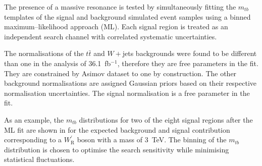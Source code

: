 The presence of a massive resonance is tested by simultaneously fitting the $m_{tb}$
templates of the signal and background simulated event samples using a binned 
maximum--likelihood approach (ML).
Each signal region is 
treated as an independent search channel with correlated systematic uncertainties.

The normalisations of the $t\bar{t}$ and $W+$jets backgrounds were found to be different than one 
in the analysis of 36.1~fb$^{-1}$, therefore they are free parameters in the fit. They are 
constrained by Asimov dataset to one by construction. 
The other background normalisations are assigned Gaussian priors based on their 
respective normalisation uncertainties. 
The signal normalisation is a free parameter in the fit.

As an example, the $m_{tb}$ distributions for two of the eight signal regions after the ML fit are shown
in  for the expected background and signal contribution corresponding to a
$W^\prime_{\mathrm{R}}$ boson with a mass of 3~TeV.
The binning of the $m_{tb}$ distribution is chosen to optimise the search sensitivity while minimising statistical fluctuations. 

